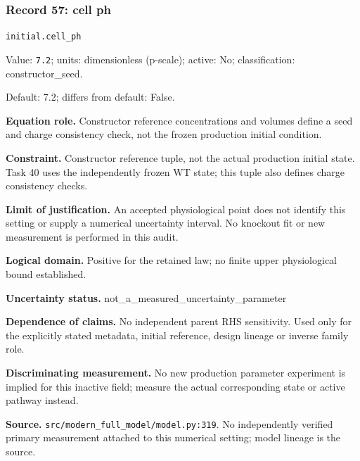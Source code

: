 \subsubsection*{Record 57: cell ph}
{\small \nolinkurl{initial.cell_ph}\par

Value: \texttt{7.2}; units: dimensionless (p-scale); active: No; classification: constructor\_seed.\par

Default: 7.2; differs from default: False.\par

\textbf{Equation role.} Constructor reference concentrations and volumes define a seed and charge consistency check, not the frozen production initial condition.\par

\textbf{Constraint.} Constructor reference tuple, not the actual production initial state. Task 40 uses the independently frozen WT state; this tuple also defines charge consistency checks.\par

\textbf{Limit of justification.} An accepted physiological point does not identify this setting or supply a numerical uncertainty interval. No knockout fit or new measurement is performed in this audit.\par

\textbf{Logical domain.} Positive for the retained law; no finite upper physiological bound established.\par

\textbf{Uncertainty status.} not\_a\_measured\_uncertainty\_parameter\par

\textbf{Dependence of claims.} No independent parent RHS sensitivity. Used only for the explicitly stated metadata, initial reference, design lineage or inverse family role.\par

\textbf{Discriminating measurement.} No new production parameter experiment is implied for this inactive field; measure the actual corresponding state or active pathway instead.\par

\textbf{Source.} \nolinkurl{src/modern_full_model/model.py:319}. No independently verified primary measurement attached to this numerical setting; model lineage is the source.\par}

